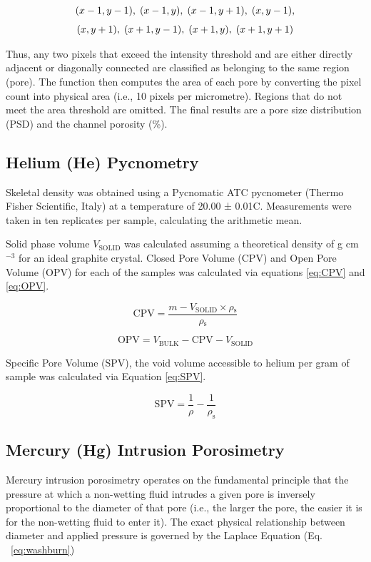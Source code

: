 \documentclass[3p,twocolumn]{elsarticle}
\begin{document}
\begin{multline*}
\footnotesize
(x-1,y-1),\; (x-1,y),\; (x-1,y+1),\; (x,y-1),\\[4pt]
(x,y+1),\; (x+1,y-1),\; (x+1,y),\; (x+1,y+1)
\end{multline*}


Thus, any two pixels that exceed the intensity threshold and are either directly
adjacent or diagonally connected are classified as belonging to the same region
(pore). The function then computes the area of each pore by converting the pixel
count into physical area (i.e., 10 pixels per micrometre). Regions that do not
meet the area threshold are omitted. The final results are a pore size
distribution (PSD) and the channel porosity (\%).


\subsection{Helium (He) Pycnometry}
	
Skeletal density was obtained using a Pycnomatic ATC pycnometer (Thermo Fisher
Scientific, Italy) at a temperature of 20.00 ± 0.01\textdegree{}C. Measurements
were taken in ten replicates per sample, calculating the arithmetic mean.

Solid phase volume $V_{\mathrm{SOLID}}$ was calculated assuming a theoretical
density of  g cm$^{-3}$ for an ideal
graphite crystal. Closed Pore Volume (CPV) and Open Pore Volume (OPV) for each
of the samples was calculated via equations \ref{eq:CPV} and \ref{eq:OPV}.

\begin{equation}
\mathrm{CPV} = \frac{m - V_{\mathrm{SOLID}} \times \rho{_\mathrm{s}}}{\rho{_\mathrm{s}}} 	\label{eq:CPV} 
\end{equation}

\begin{equation}
	\mathrm{OPV} = V_{\mathrm{BULK}} - \mathrm{CPV} - V_{\mathrm{SOLID}}\label{eq:OPV} 
\end{equation}

Specific Pore Volume (SPV), the void volume accessible to helium per gram of
sample was calculated via Equation \ref{eq:SPV}. 

\begin{equation}
\mathrm{SPV} = \frac{1}{\rho}-\frac{1}{\rho_\mathrm{s}}\label{eq:SPV} 
\end{equation}

\subsection{Mercury (Hg) Intrusion Porosimetry}
Mercury intrusion porosimetry operates on the fundamental principle that the
pressure at which a non-wetting fluid intrudes a given pore is inversely
proportional to the diameter of that pore (i.e., the larger the pore, the easier
it is for the non-wetting fluid to enter it). The exact physical relationship
between diameter and applied pressure is governed by the Laplace Equation (Eq.
~\ref{eq:washburn})
	
\end{document}
